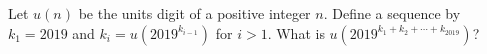 Let $u(n)$ be the units digit of a positive integer $n$. Define a sequence by $k_1=2019$ and $k_i=u\left(2019^{k_{i-1}}\right)$ for $i>1$. What is $u\left(2019^{k_1+k_2+\cdots+k_{2019}}\right)$?
